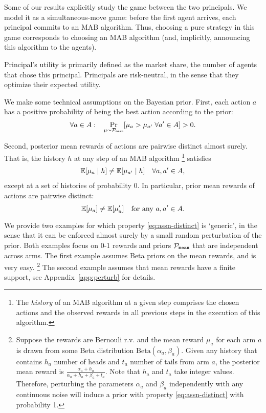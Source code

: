 Some of our results explicitly study the game between the two principals. We model it as a simultaneous-move game: before the first agent arrives, each principal commits to an MAB algorithm. Thus, choosing a pure strategy in this game corresponds to choosing an MAB algorithm (and, implicitly, announcing this algorithm to the agents).

Principal's utility is primarily defined as the market share, \ie the number of agents that chose this principal. Principals are risk-neutral, in the sense that they optimize their expected utility.

 We make some technical assumptions on the Bayesian prior. First, each action $a$ has a positive probability of being the best action according to the prior:
\begin{align}\label{eq:assn-prob}
\forall a\in A:\;\;\;  \Pr_{\mu\sim \mathcal{P}_\mathtt{mean}}[\mu_a  > \mu_{a'}
\;\forall a'\in A]
> 0.
\end{align}

Second, posterior mean rewards of actions are pairwise distinct almost
surely. That is, the history $h$ at any step of an MAB algorithm%
\footnote{The \emph{history} of an MAB algorithm at a given step
  comprises the chosen actions and the observed rewards in all
  previous steps in the execution of this algorithm.}
 satisfies
\begin{align}\label{eq:assn-distinct}
    \E[\mu_a \mid h] \neq \E[\mu_{a'}\mid h] \quad \forall a,a'\in A,
\end{align}
except at a set of histories of probability $0$.  In
particular, prior mean rewards of actions are pairwise distinct:
\[ \E[\mu_a] \neq \E[\mu_a'] \quad \text{for any $a,a'\in A$}. \]

We provide two examples for which property \eqref{eq:assn-distinct} is `generic', in the sense that it can be enforced almost surely by a
  small random perturbation of the prior. Both examples focus on 0-1 rewards and priors $\mathcal{P}_\mathtt{mean}$ that are independent across arms. The first example
  assumes Beta priors on the mean rewards, and is very easy.%
  \footnote{Suppose the rewards are Bernouli r.v. and the mean reward
    $\mu_a$ for each arm $a$ is drawn from some Beta distribution
    $\text{Beta}(\alpha_a, \beta_a)$. Given any history that contains
    $h_a$ number of heads and $t_a$ number of tails from arm $a$, the
    posterior mean reward is
    $\frac{\alpha_a + h_a}{\alpha_a + h_a + \beta_a + t_a}$. Note that
    $h_a$ and $t_a$ take integer values. Therefore, perturbing the
    parameters $\alpha_a$ and $\beta_a$ independently with any
    continuous noise will induce a prior with property
    \eqref{eq:assn-distinct} with probability 1.  }  The second
  example assumes that mean rewards have a
  finite support, see Appendix~\ref{app:perturb} for details.


